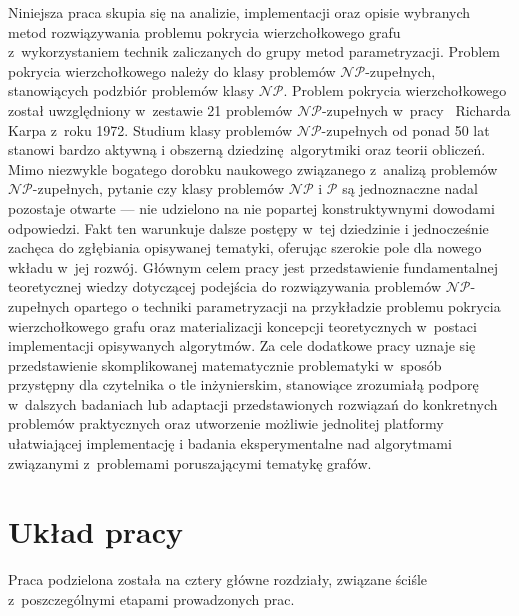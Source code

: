\par{
  Niniejsza praca skupia się na analizie, implementacji oraz opisie wybranych metod rozwiązywania problemu pokrycia wierzchołkowego grafu z~wykorzystaniem technik zaliczanych do grupy metod parametryzacji.
  Problem pokrycia wierzchołkowego należy do klasy problemów $\mathcal{NP}$-zupełnych, stanowiących podzbiór problemów klasy $\mathcal{NP}$.
  Problem pokrycia wierzchołkowego został uwzględniony w~zestawie 21 problemów $\mathcal{NP}$-zupełnych w~pracy~\cite{DBLP:Karp10} Richarda Karpa z~roku 1972.
  Studium klasy problemów $\mathcal{NP}$-zupełnych od ponad 50 lat stanowi bardzo aktywną i obszerną dziedzinę algorytmiki oraz teorii obliczeń.
  Mimo niezwykle bogatego dorobku naukowego związanego z~analizą problemów $\mathcal{NP}$-zupełnych, pytanie czy klasy problemów $\mathcal{NP}$ i $\mathcal{P}$ są jednoznaczne nadal pozostaje otwarte --- nie udzielono na nie popartej konstruktywnymi dowodami odpowiedzi.
  Fakt ten warunkuje dalsze postępy w~tej dziedzinie i jednocześnie zachęca do zgłębiania opisywanej tematyki, oferując szerokie pole dla nowego wkładu w~jej rozwój.
  Głównym celem pracy jest przedstawienie fundamentalnej teoretycznej wiedzy dotyczącej podejścia do rozwiązywania problemów $\mathcal{NP}$-zupełnych opartego o techniki parametryzacji na przykładzie problemu pokrycia wierzchołkowego grafu oraz materializacji koncepcji teoretycznych w~postaci implementacji opisywanych algorytmów.
  Za cele dodatkowe pracy uznaje się przedstawienie skomplikowanej matematycznie problematyki w~sposób przystępny dla czytelnika o tle inżynierskim, stanowiące zrozumiałą podporę w~dalszych badaniach lub adaptacji przedstawionych rozwiązań do konkretnych problemów praktycznych oraz utworzenie możliwie jednolitej platformy ułatwiającej implementację i badania eksperymentalne nad algorytmami związanymi z~problemami poruszającymi tematykę grafów.
}
\section{Układ pracy}\label{Section_Layout}
\par{
  Praca podzielona została na cztery główne rozdziały, związane ściśle z~poszczególnymi etapami prowadzonych prac.
}
